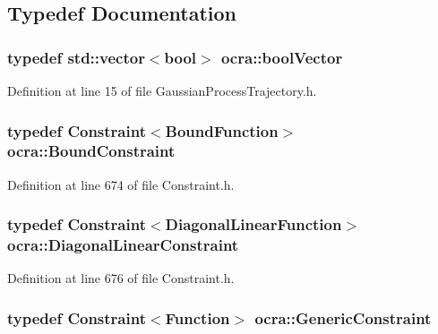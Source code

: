\subsection{Typedef Documentation}
\subsubsection[{\texorpdfstring{bool\+Vector}{boolVector}}]{\setlength{\rightskip}{0pt plus 5cm}typedef std\+::vector$<$bool$>$ {\bf ocra\+::bool\+Vector}}\hypertarget{namespaceocra_afaf4559cfedb560f8d1fe9bf6a21678f}{}\label{namespaceocra_afaf4559cfedb560f8d1fe9bf6a21678f}


Definition at line 15 of file Gaussian\+Process\+Trajectory.\+h.

\subsubsection[{\texorpdfstring{Bound\+Constraint}{BoundConstraint}}]{\setlength{\rightskip}{0pt plus 5cm}typedef {\bf Constraint}$<${\bf Bound\+Function}$>$ {\bf ocra\+::\+Bound\+Constraint}}\hypertarget{namespaceocra_a6e55fff77635080219964abc301abf18}{}\label{namespaceocra_a6e55fff77635080219964abc301abf18}


Definition at line 674 of file Constraint.\+h.

\subsubsection[{\texorpdfstring{Diagonal\+Linear\+Constraint}{DiagonalLinearConstraint}}]{\setlength{\rightskip}{0pt plus 5cm}typedef {\bf Constraint}$<${\bf Diagonal\+Linear\+Function}$>$ {\bf ocra\+::\+Diagonal\+Linear\+Constraint}}\hypertarget{namespaceocra_ab310e2c53f5e52ec3aba0a832f7dc79e}{}\label{namespaceocra_ab310e2c53f5e52ec3aba0a832f7dc79e}


Definition at line 676 of file Constraint.\+h.

\subsubsection[{\texorpdfstring{Generic\+Constraint}{GenericConstraint}}]{\setlength{\rightskip}{0pt plus 5cm}typedef {\bf Constraint}$<${\bf Function}$>$ {\bf ocra\+::\+Generic\+Constraint}}\hypertarget{namespaceocra_af10341108ce661566aad00908668e2b1}{}\label{namespaceocra_af10341108ce661566aad00908668e2b1}


